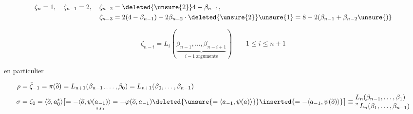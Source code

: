 \[
\begin{aligned}
\zeta_n=1,\quad \zeta_{n-1}=2,\quad \zeta_{n-2}&=\deleted{\unsure{2}}4-\beta_{n-1},\\
\zeta_{n-3}&=2(4-\beta_{n-1})-2\beta_{n-2}\cdot\deleted{\unsure{2}}\unsure{1}=8-2(\beta_{n-1}+\beta_{n-2}\unsure{)}
\end{aligned}
\]

\[
\boxed{\zeta_{n-i}=L_i(\underbrace{\beta_{n-1},\ldots,\beta_{n-i+1}}_{i-1\ \text{arguments}})}
\qquad 1\le i\le n+1
\]

en particulier

\[
\begin{aligned}
\rho&=\bar{\zeta}_{-1}=\pi(\widetilde{o})=L_{n+1}(\beta_{n-1},\ldots,\beta_0)=L_{n+1}(\beta_0,\ldots,\beta_{n-1})\\
\sigma&=\zeta_0=\langle\widetilde{o},a_0^*\rangle\bigl[=-\langle\widetilde{o},\psi(\underset{\shortparallel\,s_0}{a_{-1}})\rangle
=-\varphi(\widetilde{o},a_{-1})\deleted{\unsure{=\langle a_{-1},\psi(a)\rangle}}\inserted{=-\langle a_{-1},\psi(\widetilde{o})\rangle}\bigr]
\equiv \begin{aligned}&L_n(\beta_{n-1},\ldots,\beta_1)\\[-2pt]&\text{''}\,L_n(\beta_1,\ldots,\beta_{n-1})\end{aligned}
\end{aligned}
\]


